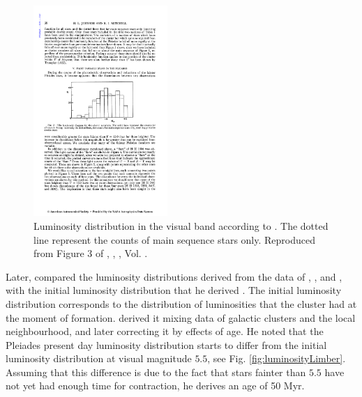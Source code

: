 \begin{figure}[ht!]
\begin{center}
\includegraphics[height=8cm]{background/Figures/F3_Johnson1958.pdf}
\caption{Luminosity distribution in the visual band according to \citet{Johnson1958}. The dotted line represent the counts of main sequence stars only. Reproduced from Figure 3 of \citet{Johnson1958}, \textit{}, , Vol. .}
\label{fig:luminosityJohnson}
\end{center}
\end{figure}

Later, \citet{Limber1962} compared the luminosity distributions derived from the data of \citet{Trumpler1921}, \citet{Hertzsprung1947}, and \citet{Johnson1958}, with the initial luminosity distribution that he derived \citep{Limber1960}. The initial luminosity distribution corresponds to the distribution of luminosities that the cluster had at the moment of formation. \citet{Limber1960} derived it mixing data of galactic clusters and the local neighbourhood, and later correcting it by effects of age. He noted that the Pleiades present day luminosity distribution starts to differ from the initial luminosity distribution at visual magnitude $5.5$, see Fig. \ref{fig:luminosityLimber}. Assuming that this difference is due to the fact that stars fainter than $5.5$ have not yet had enough time for contraction, he derives an age of 50 Myr. 

